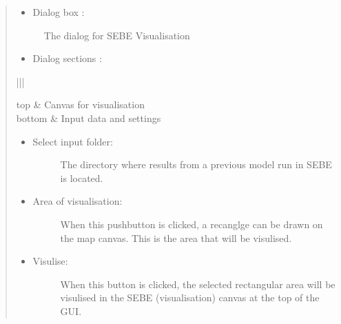 \documentclass[letterpaper,10pt,english]{sphinxmanual}
\begin{document}
\begin{quote}
\begin{itemize}
\begin{description}
\end{description}

\item {} 
Dialog box  :

\end{itemize}

\begin{figure}[htbp]
\centering
\capstart

\noindent{}
\caption{The dialog for SEBE Visualisation}\label{\detokenize{post_processor/Solar Radiation SEBE (Visualisation):id1}}\end{figure}
\begin{itemize}
\item {} 
Dialog sections  :

\end{itemize}


\begin{savenotes}\sphinxattablestart
\centering
\begin{tabular}[t]{|||}
\hline

top
&
Canvas for visualisation
\\
\hline
bottom
&
Input data and settings
\\
\hline
\end{tabular}
\par
\sphinxattableend\end{savenotes}
\begin{itemize}
\item {} \begin{description}
\item[{Select input folder:}] \leavevmode
The directory where results from a previous model run in SEBE is located.

\end{description}

\item {} \begin{description}
\item[{Area of visualisation:}] \leavevmode
When this pushbutton is clicked, a recanglge can be drawn on the map canvas. This is the area that will be visulised.

\end{description}

\item {} \begin{description}
\item[{Visulise:}] \leavevmode
When this button is clicked, the selected rectangular area will be visulised in the SEBE (visualisation) canvas at the top of the GUI.


\end{description}
\end{itemize}
\end{quote}
\end{document}
